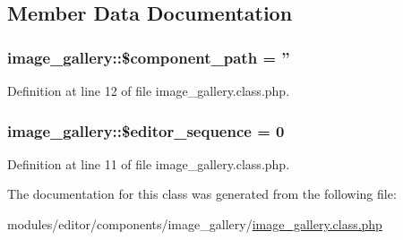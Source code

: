 \subsection{Member Data Documentation}
\hypertarget{classimage__gallery_a1ace79c095079e133d5f98625d89460e}{
\subsubsection[{\$component\-\_\-path}]{\setlength{\rightskip}{0pt plus 5cm}image\-\_\-gallery\-::\$component\-\_\-path = ''}}\label{classimage__gallery_a1ace79c095079e133d5f98625d89460e}


Definition at line 12 of file image\-\_\-gallery.\-class.\-php.

\hypertarget{classimage__gallery_a63124b017697df694664efada4edd0be}{
\subsubsection[{\$editor\-\_\-sequence}]{\setlength{\rightskip}{0pt plus 5cm}image\-\_\-gallery\-::\$editor\-\_\-sequence = 0}}\label{classimage__gallery_a63124b017697df694664efada4edd0be}


Definition at line 11 of file image\-\_\-gallery.\-class.\-php.



The documentation for this class was generated from the following file\-:\begin{DoxyCompactItemize}
\item 
modules/editor/components/image\-\_\-gallery/\hyperlink{image__gallery_8class_8php}{image\-\_\-gallery.\-class.\-php}\end{DoxyCompactItemize}
